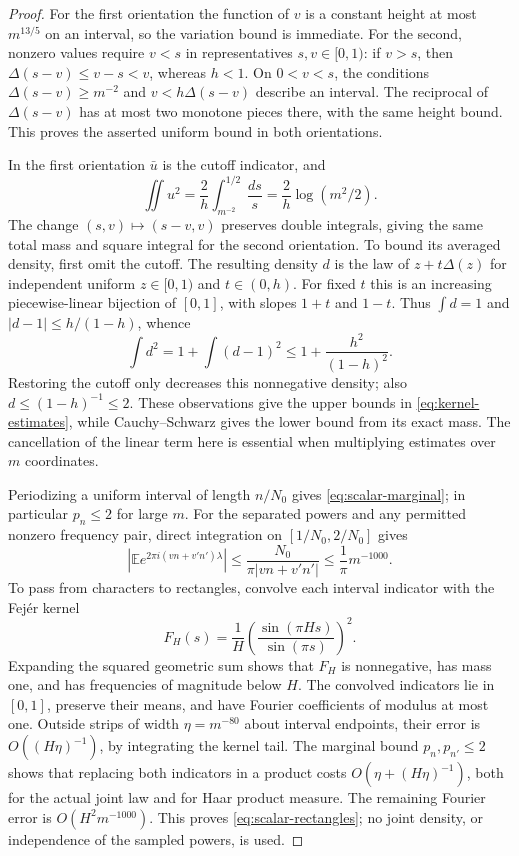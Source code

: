 \begin{proof}
For the first orientation the function of $v$ is a constant height
at most $m^{13/5}$ on an interval, so the variation bound is immediate.
For the second, nonzero values require $v<s$ in representatives
$s,v\in[0,1)$: if $v>s$, then $\Delta(s-v)\le v-s<v$, whereas
$h<1$.  On $0<v<s$, the conditions
$\Delta(s-v)\ge m^{-2}$ and $v<h\Delta(s-v)$ describe an interval.
The reciprocal of $\Delta(s-v)$ has at most two monotone pieces
there, with the same height bound.  This proves the asserted uniform
bound in both orientations.

In the first orientation $\bar u$ is the cutoff indicator, and
\[
 \iint u^2=\frac2h\int_{m^{-2}}^{1/2}\frac{ds}{s}
          =\frac2h\log(m^2/2).
\]
The change $(s,v)\mapsto(s-v,v)$ preserves double integrals, giving
the same total mass and square integral for the second orientation.
To bound its averaged density, first omit the cutoff.  The resulting
density $d$ is the law of $z+t\Delta(z)$ for independent uniform
$z\in[0,1)$ and $t\in(0,h)$.  For fixed $t$ this is an increasing
piecewise-linear bijection of $[0,1]$, with slopes $1+t$ and $1-t$.
Thus $\int d=1$ and $|d-1|\le h/(1-h)$, whence
\[
 \int d^2=1+\int(d-1)^2\le1+\frac{h^2}{(1-h)^2}.
\]
Restoring the cutoff only decreases this nonnegative density;
also $d\le(1-h)^{-1}\le2$.  These observations give the upper
bounds in \eqref{eq:kernel-estimates}, while Cauchy--Schwarz gives
the lower bound from its exact mass.  The cancellation of the linear
term here is essential when multiplying estimates over $m$ coordinates.

Periodizing a uniform interval of length $n/N_0$ gives
\eqref{eq:scalar-marginal}; in particular $p_n\le2$ for large $m$.
For the separated powers and any permitted nonzero frequency pair,
direct integration on $[1/N_0,2/N_0]$ gives
\[
 \left|\mathbb E e^{2\pi i(vn+v'n')\lambda}\right|
 \le\frac{N_0}{\pi|vn+v'n'|}\le\frac1\pi m^{-1000}.
\]
To pass from characters to rectangles, convolve each interval
indicator with the Fej\'er kernel
\[
 F_H(s)=\frac1H\left(\frac{\sin(\pi Hs)}{\sin(\pi s)}\right)^2.
\]
Expanding the squared geometric sum shows that $F_H$ is nonnegative,
has mass one, and has frequencies of magnitude below $H$.
The convolved indicators lie in $[0,1]$, preserve their means, and
have Fourier coefficients of modulus at most one.  Outside strips
of width $\eta=m^{-80}$ about interval endpoints, their error is
$O((H\eta)^{-1})$, by integrating the kernel tail.  The marginal
bound $p_n,p_{n'}\le2$ shows that replacing both indicators in a
product costs $O(\eta+(H\eta)^{-1})$, both for the actual joint
law and for Haar product measure.  The remaining Fourier error is
$O(H^2m^{-1000})$.  This proves \eqref{eq:scalar-rectangles}; no
joint density, or independence of the sampled powers, is used.


\end{proof}
